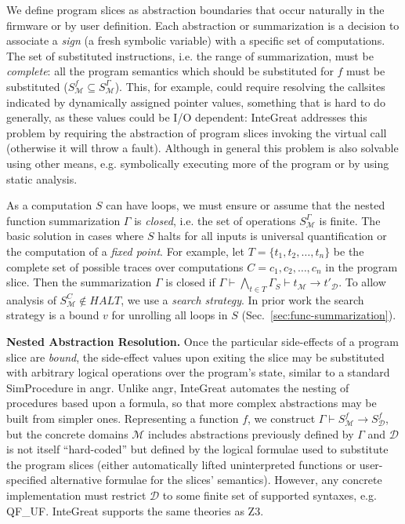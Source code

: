 We define program slices as abstraction boundaries that occur naturally in the firmware or by user definition.
Each abstraction or summarization is a decision to associate a \emph{sign} (a fresh symbolic variable) with a specific set of computations.
The set of substituted instructions, i.e. the range of summarization, must be \emph{complete}: all the program semantics which should be substituted for $f$ must be substituted ($S^{f}_{\mathcal{M}} \subseteq S^{\Gamma}_{\mathcal{M}}$).
This, for example, could require resolving the callsites indicated by dynamically assigned pointer values, something that is hard to do generally, as these values could be I/O dependent: InteGreat addresses this problem by requiring the abstraction of program slices invoking the virtual call (otherwise it will throw a fault).
Although in general this problem is also solvable using other means, e.g. symbolically executing more of the program or by using static analysis.

As a computation $S$ can have loops, we must ensure or assume that the nested function summarization $\Gamma$ is \emph{closed}, i.e. the set of operations $S^{\Gamma}_{\mathcal{M}}$ is finite.
The basic solution in cases where $S$ halts for all inputs is universal quantification or the computation of a \emph{fixed point}.
For example, let $T = \{t_{1}, t_{2}, \ldots, t_{n}\}$ be the complete set of possible traces over computations $C =c_{1}, c_{2}, \ldots, c_{n}$ in the program slice.
Then the summarization $\Gamma$ is closed if $\Gamma \vdash \bigwedge_{t \in T} \Gamma_{S} \vdash t_{\mathcal{M}} \rightarrow t'_{\mathcal{D}}$.
To allow analysis of $S^{C}_{\mathcal{M}} \notin HALT$, we use a \emph{search strategy}.
In prior work the search strategy is a bound $v$ for unrolling all loops in $S$ (Sec.~\ref{sec:func-summarization}).

\textbf{Nested Abstraction Resolution.} 
  \label{prob:abstraction-resolution}
Once the particular side-effects of a program slice are \emph{bound}, the side-effect values upon exiting the slice may be substituted with arbitrary logical operations over the program's state, similar to a standard SimProcedure in angr.
Unlike angr, InteGreat automates the nesting of procedures based upon a formula, so that more complex abstractions may be built from simpler ones.
Representing a function $f$, we construct $\Gamma \vdash S^{f}_{\mathcal{M}} \rightarrow S^{f}_{\mathcal{D}}$, but the concrete domains $\mathcal{M}$ includes abstractions previously defined by $\Gamma$ and $\mathcal{D}$ is not itself ``hard-coded'' but defined by the logical formulae used to substitute the program slices (either automatically lifted uninterpreted functions or user-specified alternative formulae for the slices' semantics).
However, any concrete implementation must restrict $\mathcal{D}$ to some finite set of supported syntaxes, e.g. QF\_UF.
InteGreat supports the same theories as Z3.


